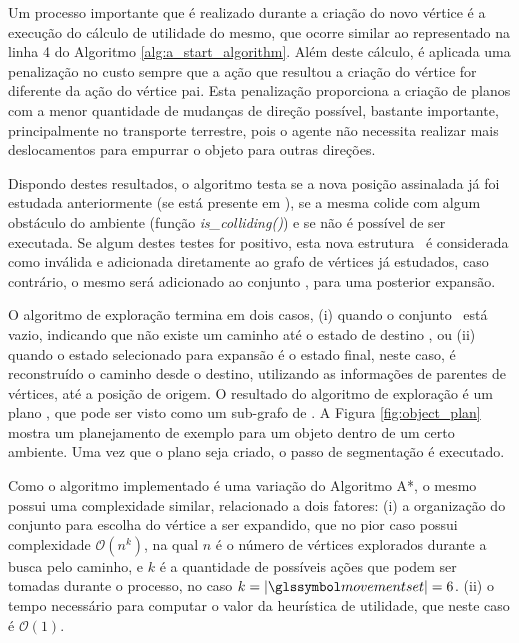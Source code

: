 Um processo importante que é realizado durante a criação do novo vértice é a execução do cálculo de utilidade do mesmo, que ocorre similar ao representado na linha 4 do Algoritmo \ref{alg:a_start_algorithm}. Além deste cálculo, é aplicada uma penalização no custo sempre que a ação que resultou a criação do vértice for diferente da ação do vértice pai.
Esta penalização proporciona a criação de planos com a menor quantidade de mudanças de direção possível, bastante importante, principalmente no transporte terrestre, pois o agente não necessita realizar mais deslocamentos para empurrar o objeto para outras direções.

Dispondo destes resultados, o algoritmo testa se a nova posição assinalada já foi estudada anteriormente (se está presente em \plangraph), se a mesma colide com algum obstáculo do ambiente (função \emph{is\_colliding()}) e se não é possível de ser executada. Se algum destes testes for positivo, esta nova estrutura \nextstate\ é considerada como inválida e adicionada diretamente ao grafo de vértices já estudados, caso contrário, o mesmo será adicionado ao conjunto \fringe, para uma posterior expansão.

O algoritmo de exploração termina em dois casos, (i) quando o conjunto \ está vazio, indicando que não existe um caminho até o estado de destino \targetstate, ou (ii) quando o estado selecionado para expansão é o estado final, neste caso, é reconstruído o caminho desde o destino, utilizando as informações de parentes de vértices, até a posição de origem.
O resultado do algoritmo de exploração é um plano , que pode ser visto como um sub-grafo de .
A Figura \ref{fig:object_plan} mostra um planejamento de exemplo para um objeto dentro de um certo ambiente.
Uma vez que o plano seja criado, o passo de segmentação é executado.

Como o algoritmo implementado é uma variação do Algoritmo A*, o mesmo possui uma complexidade similar, relacionado a dois fatores:
(i) a organização do conjunto  para escolha do vértice a ser expandido, que no pior caso possui complexidade $\mathcal{O}(n^k)$, na qual $n$ é o número de vértices explorados durante a busca pelo caminho, e $k$ é a quantidade de possíveis ações que podem ser tomadas durante o processo, no caso $k=|\sy{movementset}|= 6$.
(ii) o tempo necessário para computar o valor da heurística de utilidade, que neste caso é $\mathcal{O}(1)$.

